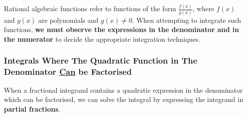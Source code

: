 \documentclass[11pt,a4paper]{book}
\begin{document}
Rational algebraic functions refer to functions of the form ${\displaystyle \frac{f(x)}{g(x)}}$,
where $f(x)$ and $g(x)$ are polynomials and $g(x)\neq0$. When attempting
to integrate such functions, \textbf{we must observe the expressions
in the denominator and in the numerator} to decide the appropriate
integration techniques.

\subsubsection{Integrals Where The Quadratic Function in The Denominator \uline{Can}
be Factorised}

When a fractional integrand contains a quadratic expression in the
denominator which can be factorised, we can solve the integral by
expressing the integrand in \textbf{partial fractions}.

\newpage
\end{document}
